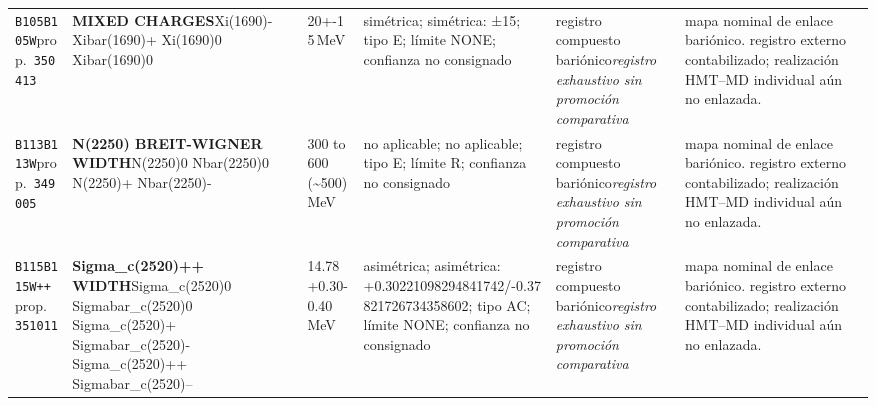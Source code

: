 \begin{landscape}
\begin{longtable}{L{1.85cm}L{4.45cm}L{2.35cm}L{4.05cm}L{3.35cm}L{7.15cm}}
\texttt{B105}\newline \texttt{B105W}\newline prop.\ \texttt{350413} & \textbf{MIXED CHARGES}\newline Xi(1690)- \textbar{}\allowbreak{} Xibar(1690)+ \textbar{}\allowbreak{} Xi(1690)0 \textbar{}\allowbreak{} Xibar(1690)0 & 20+-15\,MeV & simétrica; simétrica: ±15; tipo E; límite NONE; confianza no consignado & registro compuesto bariónico\newline \emph{registro exhaustivo sin promoción comparativa} & mapa nominal de enlace bariónico. registro externo contabilizado; realización HMT--MD individual aún no enlazada. \\
\texttt{B113}\newline \texttt{B113W}\newline prop.\ \texttt{349005} & \textbf{N(2250) BREIT-WIGNER WIDTH}\newline N(2250)0 \textbar{}\allowbreak{} Nbar(2250)0 \textbar{}\allowbreak{} N(2250)+ \textbar{}\allowbreak{} Nbar(2250)- & 300 to 600 (\textasciitilde{}500)\,MeV & no aplicable; no aplicable; tipo E; límite R; confianza no consignado & registro compuesto bariónico\newline \emph{registro exhaustivo sin promoción comparativa} & mapa nominal de enlace bariónico. registro externo contabilizado; realización HMT--MD individual aún no enlazada. \\
\texttt{B115}\newline \texttt{B115W++}\newline prop.\ \texttt{351011} & \textbf{Sigma\_\allowbreak{}c(2520)++ WIDTH}\newline Sigma\_\allowbreak{}c(2520)0 \textbar{}\allowbreak{} Sigmabar\_\allowbreak{}c(2520)0 \textbar{}\allowbreak{} Sigma\_\allowbreak{}c(2520)+ \textbar{}\allowbreak{} Sigmabar\_\allowbreak{}c(2520)- \textbar{}\allowbreak{} Sigma\_\allowbreak{}c(2520)++ \textbar{}\allowbreak{} Sigmabar\_\allowbreak{}c(2520)-- & 14.78+0.30-0.40\,MeV & asimétrica; asimétrica: +0.30221098294841742/-0.37821726734358602; tipo AC; límite NONE; confianza no consignado & registro compuesto bariónico\newline \emph{registro exhaustivo sin promoción comparativa} & mapa nominal de enlace bariónico. registro externo contabilizado; realización HMT--MD individual aún no enlazada. \\

\end{longtable}
\end{landscape}
